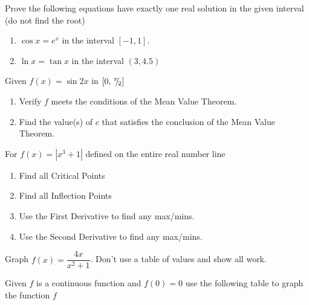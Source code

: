 \documentclass[unboxed]{hwset}
\begin{document}
\begin{problem}[1.]
	Prove the following  equations have exactly one real solution in the given
	interval (do not find the root)
	\begin{enumerate}
		\item $\cos x = e^x$ in the interval $[-1,1]$.
		\item $\ln x = \tan x$ in the interval $(3,4.5)$
	\end{enumerate}
\end{problem}

\begin{problem}[2.]
	Given $f(x) = \sin 2x $ in $[0, \,^{\pi}\!\!/\!_{2}]$
	\begin{enumerate}
		\item Verify $f$ meets the conditions of the Mean Value Theorem.
		\item Find the value(s) of $c$ that satisfies the conclusion of the Mean
			Value Theorem.
	\end{enumerate}
\end{problem}

\begin{problem}[3.]
	For $f(x) = \left| x^3 + 1\right|$ defined on the entire real	number line
	\begin{enumerate}
		\item Find all Critical Points
		\item Find all Inflection Points
		\item Use the First Derivative to find any max/mins.
		\item Use the Second Derivative to find any max/mins.
	\end{enumerate}
\end{problem}

\begin{problem}[4.]
	Graph $f(x) = \dfrac{4x}{x^2 + 1}$. Don't use a table of values and show all
	work.
\end{problem}

\begin{problem}[5.]
	Given $f$ is a continuous function and $f(0) = 0$ use the following table
	to graph the function $f$
	\begin{center}
	\end{center}
\end{problem}
\end{document}

